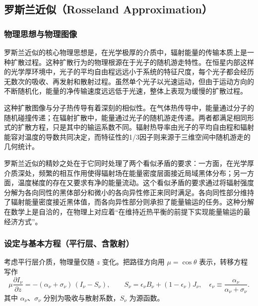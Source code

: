 \subsection{罗斯兰近似（Rosseland Approximation）}


\subsubsection*{物理思想与物理图像}

罗斯兰近似的核心物理思想是，在光学极厚的介质中，辐射能量的传输本质上是一种扩散过程。这种扩散行为的物理根源在于光子的随机游走特性。在恒星内部这样的光学厚环境中，光子的平均自由程远远小于系统的特征尺度，每个光子都会经历无数次的吸收、再发射和散射过程。虽然单个光子以光速运动，但由于运动方向的不断随机化，能量的净传输速度远远低于光速，整体上表现为缓慢的扩散过程。

这种扩散图像与分子热传导有着深刻的相似性。在气体热传导中，能量通过分子的随机碰撞传递；在辐射扩散中，能量通过光子的随机游走传递。两者都满足相同形式的扩散方程，只是其中的输运系数不同。辐射热导率由光子的平均自由程和辐射能容对温度的导数共同决定，而特征性的1/3因子则来源于三维空间中随机游走的几何统计。

罗斯兰近似的精妙之处在于它同时处理了两个看似矛盾的要求：一方面，在光学厚介质深处，频繁的相互作用使得辐射场在能量密度层面接近局域黑体分布；另一方面，温度梯度的存在又要求有净的能量流动。这个看似矛盾的要求通过将辐射强度分解为各向同性的黑体部分和微小的各向异性修正来同时满足。各向同性部分维持了辐射能量密度接近黑体值，而各向异性部分则承担了能量输运的任务。这种分解在数学上是自洽的，在物理上对应着“在维持近热平衡的前提下实现能量输运的最经济方式”。

\subsubsection*{设定与基本方程（平行层、含散射）}

考虑平行层介质，物理量仅随 $z$ 变化。把路径方向用
$\mu=\cos\theta$ 表示，转移方程写作
\[
\mu \frac{\partial I_\nu}{\partial z}
= -(\alpha_\nu+\sigma_\nu)\, (I_\nu - S_\nu),
\qquad
S_\nu = \epsilon_\nu B_\nu + (1-\epsilon_\nu)J_\nu,
\quad \epsilon_\nu\equiv\frac{\alpha_\nu}{\alpha_\nu+\sigma_\nu}.
\]
其中 $\alpha_\nu$、$\sigma_\nu$ 分别为吸收与散射系数，$S_\nu$ 为源函数。

